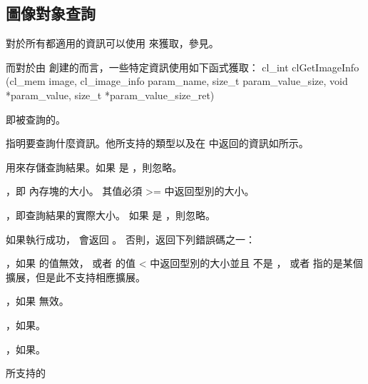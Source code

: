 \subsection{圖像對象查詢}

對於所有都適用的資訊可以使用  來獲取，參見。

而對於由  創建的而言，一些特定資訊使用如下函式獲取：
\startclc
cl_int clGetImageInfo (cl_mem image,
			cl_image_info param_name,
			size_t param_value_size,
			void *param_value,
			size_t *param_value_size_ret)
\stopclc

 即被查詢的。

 指明要查詢什麼資訊。他所支持的類型以及在  中返回的資訊如所示。

 用來存儲查詢結果。如果  是 ，則忽略。

，即  內存塊的大小。
其值必須 >= 中返回型別的大小。

，即查詢結果的實際大小。
如果  是 ，則忽略。

如果執行成功，  會返回 。
否則，返回下列錯誤碼之一：
\startigBase
\item {}，如果  的值無效，
或者  的值 < 中返回型別的大小並且  不是 ，
或者  指的是某個擴展，但是此不支持相應擴展。

\item {}，如果  無效。

\item {}，如果\scdevfailres。
\item {}，如果\schostfailres。
\stopigBase

\startbuffer[tblclgetimginfo]
 所支持的 
\stopbuffer

